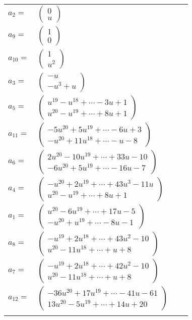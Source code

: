 \documentclass[1p]{elsarticle_modified}
\theoremstyle{definition}
\begin{document}
\begin{tabular}{m{7pt} m{180pt} m{7pt} m{180pt} }
\flushright $a_{2}=$&$\begin{pmatrix}0\\u\end{pmatrix}$ \\
\flushright $a_{9}=$&$\begin{pmatrix}1\\0\end{pmatrix}$ \\
\flushright $a_{10}=$&$\begin{pmatrix}1\\u^2\end{pmatrix}$ \\
\flushright $a_{3}=$&$\begin{pmatrix}- u\\- u^3+u\end{pmatrix}$ \\
\flushright $a_{5}=$&$\begin{pmatrix}u^{19}- u^{18}+\cdots-3 u+1\\u^{20}- u^{19}+\cdots+8 u+1\end{pmatrix}$ \\
\flushright $a_{11}=$&$\begin{pmatrix}-5 u^{20}+5 u^{19}+\cdots-6 u+3\\- u^{20}+11 u^{18}+\cdots- u-8\end{pmatrix}$ \\
\flushright $a_{6}=$&$\begin{pmatrix}2 u^{20}-10 u^{19}+\cdots+33 u-10\\-6 u^{20}+5 u^{19}+\cdots-16 u-7\end{pmatrix}$ \\
\flushright $a_{4}=$&$\begin{pmatrix}- u^{20}+2 u^{19}+\cdots+43 u^3-11 u\\u^{20}- u^{19}+\cdots+8 u+1\end{pmatrix}$ \\
\flushright $a_{1}=$&$\begin{pmatrix}u^{20}-6 u^{19}+\cdots+17 u-5\\- u^{20}+u^{19}+\cdots-8 u-1\end{pmatrix}$ \\
\flushright $a_{8}=$&$\begin{pmatrix}- u^{19}+2 u^{18}+\cdots+43 u^2-10\\u^{20}-11 u^{18}+\cdots+u+8\end{pmatrix}$ \\
\flushright $a_{7}=$&$\begin{pmatrix}- u^{19}+2 u^{18}+\cdots+42 u^2-10\\u^{20}-11 u^{18}+\cdots+u+8\end{pmatrix}$ \\
\flushright $a_{12}=$&$\begin{pmatrix}-36 u^{20}+17 u^{19}+\cdots-41 u-61\\13 u^{20}-5 u^{19}+\cdots+14 u+20\end{pmatrix}$\\&\end{tabular}
\end{document}
